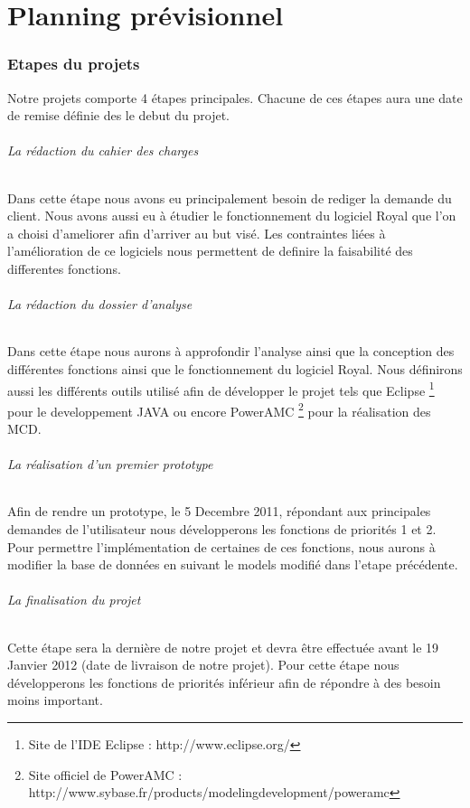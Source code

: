 \part{Planning prévisionnel}

\section{Etapes du projets}

Notre projets comporte 4 étapes principales. Chacune de ces étapes aura une date de remise définie des le debut du projet. 

\paragraph{La rédaction du cahier des charges}
Dans cette étape nous avons eu principalement besoin de rediger la demande du client. 
Nous avons aussi eu à étudier le fonctionnement du logiciel Royal que l'on a choisi d'ameliorer afin d'arriver au but visé.
Les contraintes liées à l'amélioration de ce logiciels nous permettent de definire la faisabilité des differentes fonctions. 

\paragraph{La rédaction du dossier d'analyse}
Dans cette étape nous aurons à approfondir l'analyse ainsi que la conception des différentes fonctions ainsi que le fonctionnement du logiciel Royal. 
Nous définirons aussi les différents outils utilisé afin de développer le projet tels que 
Eclipse \footnote{Site de l'IDE Eclipse : http://www.eclipse.org/} 
pour le developpement JAVA ou encore 
PowerAMC \footnote{Site officiel de PowerAMC : http://www.sybase.fr/products/modelingdevelopment/poweramc}
pour la réalisation des MCD.

\paragraph{La réalisation d'un premier prototype}
Afin de rendre un prototype, le 5 Decembre 2011, répondant aux principales demandes de l'utilisateur nous développerons les fonctions de priorités 1 et 2.
Pour permettre l'implémentation de certaines de ces fonctions, nous aurons à modifier la base de données en suivant le models modifié dans l'etape précédente.  

\paragraph{La finalisation du projet}
Cette étape sera la dernière de notre projet et devra être effectuée avant le 19 Janvier 2012 (date de livraison de notre projet).
Pour cette étape nous développerons les fonctions de priorités inférieur afin de répondre à des besoin moins important. 


